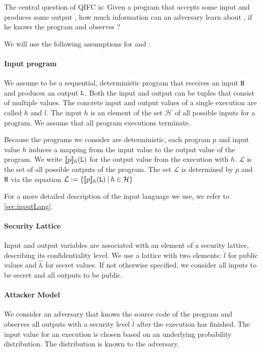 The central question of QIFC is: Given a program \p that accepts some input \In and produces some output \Out, how much information can an adversary \A{} learn about \In, if he knows the program \p and observes \Out?

We will use the following assumptions for \p and \A:

\paragraph{Input program}\label{p:input} We assume \p to be a sequential, deterministic program that receives an input $\mathtt{H}$ and produces an output $\mathtt{L}$. Both the input and output can be tuples that consist of multiple values. The concrete input and output values of a single execution are called $h$ and $l$. The input $h$ is an element of the set $\mathcal{H}$ of all possible inputs for a program. We assume that all program executions terminate.

Because the programs we consider are deterministic, each program $p$ and input value $h$ induces a mapping from the input value to the output value of the program. We write $\llbracket p \rrbracket_h(\mathtt{L})$ for the output value from the execution with $h$. $\mathcal{L}$ is the set of all possible outputs of the program. The set $\mathcal{L}$ is determined by $p$ and $\mathtt{H}$ via the equation $\mathcal{L} := \{\llbracket p \rrbracket_h(\mathtt{L}) \: | \: h \in \mathcal{H} \}$

For a more detailed description of the input language we use, we refer to \ref{sec:inputLang}.

\paragraph{Security Lattice} Input and output variables are associated with an element of a security lattice, describing its confidentiality level. We use a lattice with two elements: $\hat{l}$ for public values and $\hat{h}$ for secret values. If not otherwise specified, we consider all inputs to be secret and all outputs to be public.

\paragraph{Attacker Model} We consider an adversary \A that knows the source code of the program \p{} and observes all outputs with a security level $\hat{l}$ after the execution has finished. The input value for an execution is chosen based on an underlying probability distribution. The distribution is known to the adversary.

